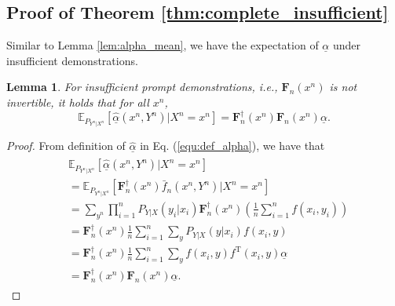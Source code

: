 \documentclass{article} %
\theoremstyle{plain} %
\newtheorem{lemma}[theorem]{Lemma}          %
\begin{document}
\subsection{Proof of Theorem \ref{thm:complete_insufficient}}\label{append:theorem2_proof}
Similar to Lemma \ref{lem:alpha_mean}, we have the expectation of $\underline{\alpha}$ under insufficient demonstrations.
\begin{lemma}\label{lem:alpha_mean_insufficient}
For insufficient prompt demonstrations, i.e., $\mathbf{F}_n(x^n)$ is not invertible, it holds that for all $x^n$,
\begin{equation*}
    \mathbb{E}_{P_{Y^n|X^n}}[\underline{\hat{\alpha}}(x^n,Y^n) | X^n=x^n] = \mathbf{F}_n^{\dagger}(x^n)\mathbf{F}_n(x^n)\underline{\alpha}.
\end{equation*}
\end{lemma}
\begin{proof}
From definition of $\underline{\hat{\alpha}}$ in Eq. (\ref{equ:def_alpha}), we have that
\begin{align*}
\begin{aligned}
& \mathbb{E}_{P_{Y^n|X^n}}\left[ \underline{\hat{\alpha}}(x^n, Y^n) | X^n = x^n \right]\\ 
& = \mathbb{E}_{P_{Y^n|X^n}}\left[ \mathbf{F}_n^{\dagger}(x^n) \bar{f}_n(x^n,Y^n)  | X^n=x^n\right]\\
& = \sum_{y^n} \prod_{i=1}^n P_{Y\vert X}(y_i\vert x_i) \mathbf{F}_n^{\dagger}(x^n) \left(\frac{1}{n}\sum_{i=1}^nf(x_i,y_i)\right)\\
& = \mathbf{F}_n^{\dagger}(x^n)  \frac1n \sum_{i=1}^n \sum_y P_{Y\vert X}(y\vert x_i) f(x_i,y)\\
& = \mathbf{F}_n^{\dagger}(x^n) \frac1n\sum_{i=1}^n \sum_y f(x_i,y) f^\mathrm{T}(x_i,y) \underline{\alpha} \\
&=\mathbf{F}_n^{\dagger}(x^n)\mathbf{F}_n(x^n)\underline{\alpha}.
\end{aligned}
\end{align*}
\end{proof}
\end{document}
